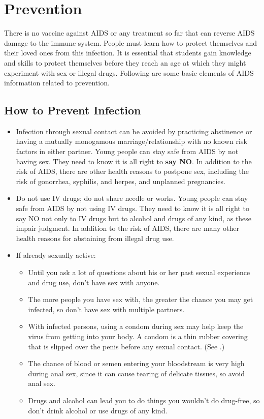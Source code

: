 \section{Prevention}

There is no vaccine against AIDS or any treatment so far that can reverse AIDS damage to
the immune system. People must learn how to protect themselves and their loved ones from
this infection. It is essential that students gain knowledge and skills to protect themselves
before they reach an age at which they might experiment with sex or illegal drugs. Following
are some basic elements of AIDS information related to prevention.

\subsection{How to Prevent Infection}

\begin{itemize}
\item Infection through sexual contact can be avoided by practicing abstinence or having a
mutually monogamous marriage/relationship with no known risk factors in either partner.
Young people can stay safe from AIDS by not having sex. They need to know it is all right
to \textbf{say NO}. In addition to the risk of AIDS, there are other health reasons to postpone sex,
including the risk of gonorrhea, syphilis, and herpes, and unplanned pregnancies.
\item Do not use IV drugs; do not share needle or works. Young people can stay safe from
AIDS by not using IV drugs. They need to know it is all right to say NO not only to IV drugs
but to alcohol and drugs of any kind, as these impair judgment. In addition to the risk of
AIDS, there are many other health reasons for abstaining from illegal drug use.
\item If already sexually active:
	\begin{itemize}
	\item Until you ask a lot of questions about his or her past sexual experience and drug use,
don't have sex with anyone.
	\item The more people you have sex with, the greater the chance you may get infected, so
don't have sex with multiple partners.
	\item With infected persons, using a condom during sex may help keep the virus from
getting into your body. A condom is a thin rubber covering that is slipped over the penis
before any sexual contact. (See .)
	\item The chance of blood or semen entering your bloodstream is very high during anal sex,
since it can cause tearing of delicate tissues, so avoid anal sex.
	\item Drugs and alcohol can lead you to do things you wouldn't do drug-free, so don't drink
alcohol or use drugs of any kind.
	\end{itemize}
\end{itemize}

